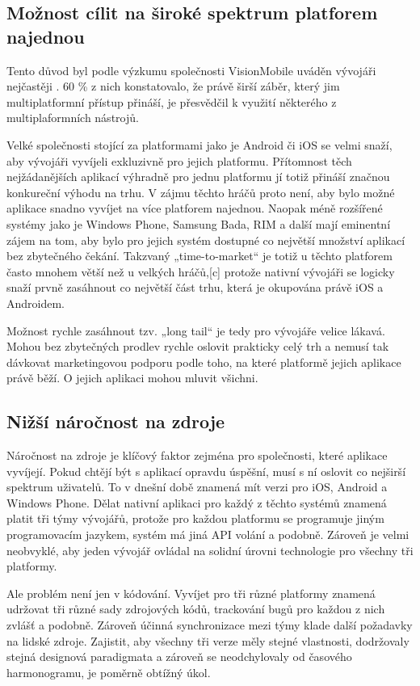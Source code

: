 \subsection{Možnost cílit na široké spektrum platforem najednou}
Tento důvod byl podle výzkumu společnosti VisionMobile uváděn vývojáři nejčastěji \cite{visionmobile_survey}. 60 \% z nich konstatovalo, že právě širší záběr, který jim multiplatformní přístup přináší, je přesvědčil k využití některého z multiplaformních nástrojů.

Velké společnosti stojící za platformami jako je Android či iOS se velmi snaží, aby vývojáři vyvíjeli exkluzivně pro jejich platformu. Přítomnost těch nejžádanějších aplikací výhradně pro jednu platformu jí totiž přináší značnou konkureční výhodu na trhu. V zájmu těchto hráčů proto není, aby bylo možné aplikace snadno vyvíjet na více platforem najednou. Naopak méně rozšířené systémy jako je Windows Phone, Samsung Bada, RIM a další mají eminentní zájem na tom, aby bylo pro jejich systém dostupné co největší množství aplikací bez zbytečného čekání. Takzvaný „time-to-market“ je totiž u těchto platforem často mnohem větší než u velkých hráčů,[c] protože nativní vývojáři se logicky snaží prvně zasáhnout co největší část trhu, která je okupována právě iOS a Androidem. 

Možnost rychle zasáhnout tzv. „long tail“ je tedy pro vývojáře velice lákavá. Mohou bez zbytečných prodlev rychle oslovit prakticky celý trh a nemusí tak dávkovat marketingovou podporu podle toho, na které platformě jejich aplikace právě běží. O jejich aplikaci mohou mluvit všichni.

\subsection{Nižší náročnost na zdroje}
Náročnost na zdroje je klíčový faktor zejména pro společnosti, které aplikace vyvíjejí. Pokud chtějí být s aplikací opravdu úspěšní, musí s ní oslovit co nejširší spektrum uživatelů. To v dnešní době znamená mít verzi pro iOS, Android a Windows Phone. Dělat nativní aplikaci pro každý z těchto systémů znamená platit tři týmy vývojářů, protože pro každou platformu se programuje jiným programovacím jazykem, systém má jiná API volání a podobně. Zároveň je velmi neobvyklé, aby jeden vývojář ovládal na solidní úrovni technologie pro všechny tři platformy.

Ale problém není jen v kódování. Vyvíjet pro tři různé platformy znamená udržovat tři různé sady zdrojových kódů, trackování bugů pro každou z nich zvlášť a podobně. Zároveň účinná synchronizace mezi týmy klade další požadavky na lidské zdroje. Zajistit, aby všechny tři verze měly stejné vlastnosti, dodržovaly stejná designová paradigmata a zároveň se neodchylovaly od časového harmonogramu, je poměrně obtížný úkol.

